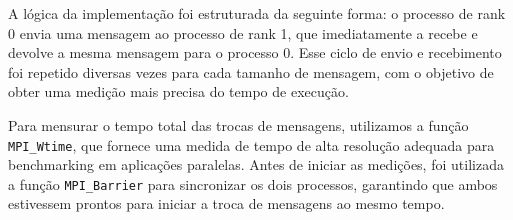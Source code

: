 \documentclass[a4paper, 12pt]{article}
\begin{document}
	\hspace{0.62cm}A lógica da implementação foi estruturada da seguinte forma: o processo de rank 0 envia uma mensagem ao processo de rank 1, que imediatamente a recebe e devolve a mesma mensagem para o processo 0. Esse ciclo de envio e recebimento foi repetido diversas vezes para cada tamanho de mensagem, com o objetivo de obter uma medição mais precisa do tempo de execução.
	
	\hspace{0.62cm}Para mensurar o tempo total das trocas de mensagens, utilizamos a função \texttt{MPI\_Wtime}, que fornece uma medida de tempo de alta resolução adequada para benchmarking em aplicações paralelas. Antes de iniciar as medições, foi utilizada a função \texttt{MPI\_Barrier} para sincronizar os dois processos, garantindo que ambos estivessem prontos para iniciar a troca de mensagens ao mesmo tempo.
	
\end{document}
